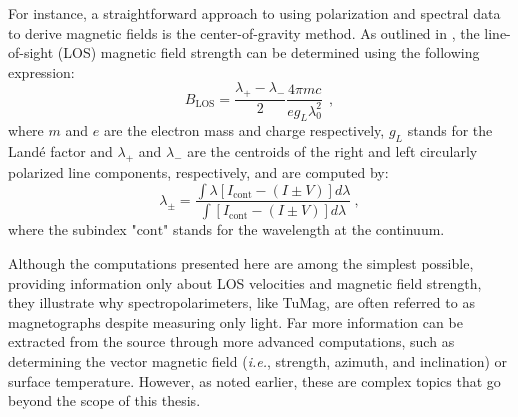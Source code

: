 For instance, a straightforward approach to using polarization and spectral data to derive magnetic fields is the center-of-gravity method. As outlined in \cite{center_of_gravity}, the line-of-sight (LOS) magnetic field strength can be determined using the following expression:
\begin{equation}
  B_{\text{LOS}} = \frac{\lambda _ {+} - \lambda _ -}{2}\frac{4\pi m c}{eg_{L}\lambda_0 ^2}\ \ ,
  \label{eq_spectro: Blos-cog}
\end{equation}  
where $m$ and $e$ are the electron mass and charge respectively, $g_L$ stands for the Landé factor and $\lambda _ {+}$ and $\lambda _ {-}$ are the centroids of the right and left circularly polarized line components, respectively, and are computed by:
\begin{equation}
  \lambda _ {\pm} = \frac{\int \lambda \left[I_{\text{cont}} - (I \pm V)\right]d\lambda}{\int \left[I_{\text{cont}} - (I \pm V)\right]d\lambda} \ ,
  \label{eq_spectro: lambda_plus_minus}
\end{equation} 
where the subindex "$\text{cont}$" stands for the wavelength at the continuum. 

Although the computations presented here are among the simplest possible, providing information only about LOS velocities and magnetic field strength, they illustrate why spectropolarimeters, like TuMag, are often referred to as magnetographs despite measuring only light. Far more information can be extracted from the source through more advanced computations, such as determining the vector magnetic field (\textit{i.e.}, strength, azimuth, and inclination) or surface temperature. However, as noted earlier, these are complex topics that go beyond the scope of this thesis.